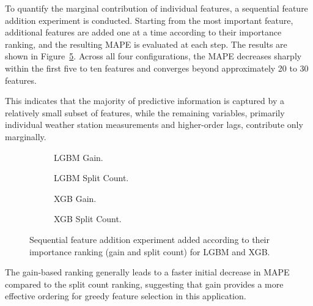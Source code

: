 To quantify the marginal contribution of individual features, a sequential feature addition experiment is conducted. Starting from the most important feature, additional features are added one at a time according to their importance ranking, and the resulting \ac{MAPE} is evaluated at each step. The results are shown in Figure~\ref{fig:feature_selection}. Across all four configurations, the \ac{MAPE} decreases sharply within the first five to ten features and converges beyond approximately 20 to 30 features.

This indicates that the majority of predictive information is captured by a relatively small subset of features, while the remaining variables, primarily individual weather station measurements and higher-order lags, contribute only marginally.
\begin{figure}[ht]
    \centering
    \begin{subfigure}[c]{0.48\linewidth}
        \centering
        \caption{\acs{LGBM} Gain.}
        \label{fig:feature_selection_lgbm_gain}
    \end{subfigure}
    \begin{subfigure}[c]{0.48\linewidth}
        \centering
        \caption{\acs{LGBM} Split Count.}
        \label{fig:feature_selection_lgbm_split}
    \end{subfigure}
    \begin{subfigure}[c]{0.48\linewidth}
        \centering
        \caption{\acs{XGB} Gain.}
        \label{fig:feature_selection_xgb_gain}
    \end{subfigure}
    \begin{subfigure}[c]{0.48\linewidth}
        \centering
        \caption{\acs{XGB} Split Count.}
        \label{fig:feature_selection_xgb_split}
    \end{subfigure}
    \caption{Sequential feature addition experiment added according to their importance ranking (gain and split count) for \acs{LGBM} and \acs{XGB}.}
    \label{fig:feature_selection}
\end{figure}
\FloatBarrier
The gain-based ranking generally leads to a faster initial decrease in \ac{MAPE} compared to the split count ranking, suggesting that gain provides a more effective ordering for greedy feature selection in this application.


